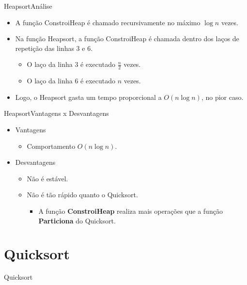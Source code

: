 \documentclass[aspectratio=169]{beamer}
\begin{document}

\begin{frame}{Heapsort}{Análise}
\begin{itemize}
\item A função ConstroiHeap é chamado recursivamente no máximo $\log n$ vezes.
\item Na função Heapsort, a função ConstroiHeap é chamada dentro dos laços de repetição das linhas 3 e 6.
\begin{itemize}
\item O laço da linha 3 é executado $\frac{n}{2}$ vezes.
\item O laço da linha 6 é executado $n$ vezes.
\end{itemize}
\item Logo, o Heapsort gasta um tempo proporcional a $O(n \log n)$, no pior caso.
\end{itemize}
\end{frame}



\begin{frame}{Heapsort}{Vantagens x Desvantagens}
\begin{itemize}
\item Vantagens
\begin{itemize}
\item Comportamento $O(n \log n)$.
\end{itemize}
\item Desvantagens
\begin{itemize}
\item Não é estável.
\item Não é tão rápido quanto o Quicksort.
\begin{itemize}
\item A função {\bf ConstroiHeap} realiza mais operações que a função {\bf Particiona} do Quicksort.
\end{itemize}
\end{itemize}
\end{itemize}
\end{frame}

\section{Quicksort}

\begin{frame}
\Huge{\centerline{Quicksort}}
\end{frame}
\end{document}
